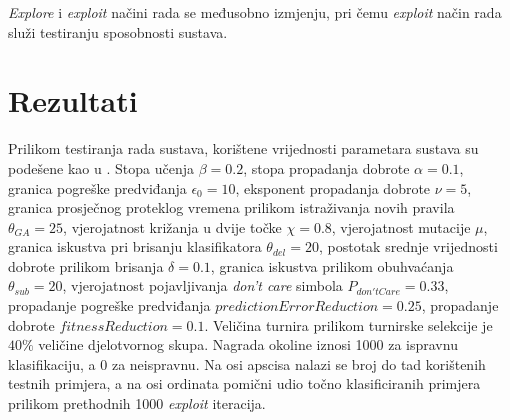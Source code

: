 \documentclass[times, utf8, zavrsni]{fer}
\begin{document}
\emph{Explore} i \emph{exploit} načini rada se međusobno izmjenju, pri čemu \emph{exploit} način rada služi testiranju sposobnosti sustava.

\chapter{Rezultati}
Prilikom testiranja rada sustava, korištene vrijednosti parametara sustava su podešene kao u \citep{4}.
Stopa učenja $\beta = 0.2$, stopa propadanja dobrote $\alpha = 0.1$, granica pogreške predviđanja $\epsilon_{0} = 10$, eksponent propadanja dobrote $\nu = 5$, granica prosječnog proteklog vremena prilikom istraživanja novih pravila $\theta_{GA} = 25$, vjerojatnost križanja u dvije točke $\chi = 0.8$, vjerojatnost mutacije $\mu$, granica iskustva pri brisanju klasifikatora $\theta_{del} = 20$, postotak srednje vrijednosti dobrote prilikom brisanja $\delta = 0.1$, granica iskustva prilikom obuhvaćanja $\theta_{sub} = 20$, vjerojatnost pojavljivanja \emph{don't care} simbola $P_{don'tCare} = 0.33$, propadanje pogreške predviđanja $predictionErrorReduction = 0.25$, propadanje dobrote $fitnessReduction = 0.1$.
Veličina turnira prilikom turnirske selekcije je $40\%$ veličine djelotvornog skupa.
Nagrada okoline iznosi 1000 za ispravnu klasifikaciju, a 0 za neispravnu.
Na osi apscisa nalazi se broj do tad korištenih testnih primjera, a na osi ordinata pomični udio točno klasificiranih primjera prilikom prethodnih 1000 \emph{exploit} iteracija.
\end{document}
